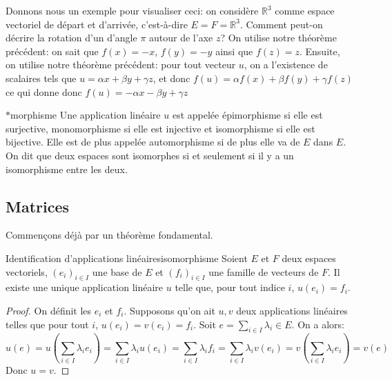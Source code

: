 \documentclass{classe}
\begin{document}
\begin{example}
Donnons nous un exemple pour visualiser ceci: on considère $\mathbb{R}^3$ comme espace vectoriel de départ et d'arrivée, c'est-à-dire $E = F = \mathbb{R}^3$.
Comment peut-on décrire la rotation d'un d'angle $\pi$ autour de l'axe $z$?
On utilise notre théorème précédent: on sait que $f(x) = -x$, $f(y) = -y$ ainsi que $f(z) = z$.
Ensuite, on utilise notre théorème précédent: pour tout vecteur $u$, on a l'existence de scalaires tels que $u = \alpha x + \beta y + \gamma z$, et donc $f(u) = \alpha f(x) + \beta f(y) + \gamma f(z)$ ce qui donne donc $f(u) = -\alpha x - \beta y + \gamma z$
\end{example}

\begin{définition}{$*$morphisme}{}
	Une application linéaire $u$ est appelée épimorphisme si elle est surjective, monomorphisme si elle est injective et isomorphisme si elle est bijective.
	Elle est de plus appelée automorphisme si de plus elle va de $E$ dans $E$.
	On dit que deux espaces sont isomorphes si et seulement si il y a un isomorphisme entre les deux.
\end{définition}

\subsection{Matrices}
Commençons déjà par un théorème fondamental.

\begin{théorème}{Identification d'applications linéaires}{isomorphisme}
	Soient $E$ et $F$ deux espaces vectoriels, $(e_i)_{i\in I}$ une base de $E$ et $(f_i)_{i\in I}$ une famille de vecteurs de $F$. Il existe une unique application linéaire $u$ telle que, pour tout indice $i$, $u(e_{i}) = f_{i}$.
\end{théorème}
\begin{proof}
	On définit les $e_{i}$ et $f_{i}$.
	Supposons qu'on ait $u, v$ deux applications linéaires telles que pour tout $i$, $u\left( e_{i} \right) = v\left( e_{i} \right) = f_{i}$.
	Soit $e = \sum_{i \in I} \lambda_{i} \in E$. On a alors:
	\begin{equation*}
		u(e) = u\left(\sum_{i \in I}\lambda_{i}e_{i}\right) = \sum_{i \in I}\lambda_{i}u\left( e_{i} \right) = \sum_{i \in I}\lambda_{i}f_{i} = \sum_{i \in I} \lambda_{i}v\left( e_{i} \right) = v\left( \sum_{i \in I}\lambda_{i}e_{i} \right) = v\left( e \right)
	\end{equation*}
	Donc $u = v$.
\end{proof}
\end{document}
